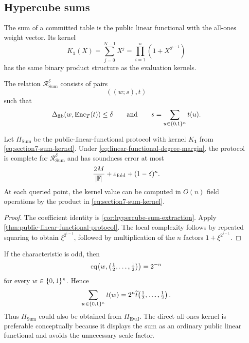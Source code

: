 \subsection{Hypercube sums}
\label{sec:hypercube-sum-protocol}

The sum of a committed table is the public linear functional with the all-ones weight vector.  Its kernel
\begin{equation}
  K_{\mathbf1}(X)
  =\sum_{j=0}^{N-1}X^j
  =\prod_{i=1}^{n}(1+X^{2^{i-1}})
  \label{eq:section7-sum-kernel}
\end{equation}
has the same binary product structure as the evaluation kernels.

\begin{definition}
\label{def:hypercube-sum-relation}
The relation \(\mathcal R^{\delta}_{\mathrm{Sum}}\) consists of pairs
\[
  ((w;s),t)
\]
such that
\[
  \Delta_{\mathrm{fib}}(w,\operatorname{Enc}_T(t))\le\delta
  \qquad\text{and}\qquad
  s=\sum_{u\in\{0,1\}^n}t(u).
\]
\end{definition}

\begin{corollary}
\label{cor:hypercube-sum-protocol}
Let \(\Pi_{\mathrm{Sum}}\) be the public-linear-functional protocol with kernel \(K_{\mathbf1}\) from \eqref{eq:section7-sum-kernel}.  Under \eqref{eq:linear-functional-degree-margin}, the protocol is complete for \(\mathcal R^{\delta}_{\mathrm{Sum}}\) and has soundness error at most
\begin{equation}
  \frac{2M}{|\mathbb{F}|}
  +\varepsilon_{\mathrm{fold}}
  +(1-\delta)^\kappa.
  \label{eq:hypercube-sum-protocol-soundness}
\end{equation}
At each queried point, the kernel value can be computed in \(O(n)\) field operations by the product in \eqref{eq:section7-sum-kernel}.
\end{corollary}

\begin{proof}
The coefficient identity is \cref{cor:hypercube-sum-extraction}.  Apply \cref{thm:public-linear-functional-protocol}.  The local complexity follows by repeated squaring to obtain \(\xi^{2^{i-1}}\), followed by multiplication of the \(n\) factors \(1+\xi^{2^{i-1}}\).
\end{proof}

\begin{remark}
\label{rem:sum-as-evaluation}
If the characteristic is odd, then
\[
  \operatorname{eq}\!\left(w,\left(\tfrac12,\ldots,\tfrac12\right)\right)=2^{-n}
\]
for every \(w\in\{0,1\}^n\).  Hence
\[
  \sum_{w\in\{0,1\}^n}t(w)
  =2^n\widetilde t\!\left(\tfrac12,\ldots,\tfrac12\right).
\]
Thus \(\Pi_{\mathrm{Sum}}\) could also be obtained from \(\Pi_{\mathrm{Eval}}\).  The direct all-ones kernel is preferable conceptually because it displays the sum as an ordinary public linear functional and avoids the unnecessary scale factor.
\end{remark}

